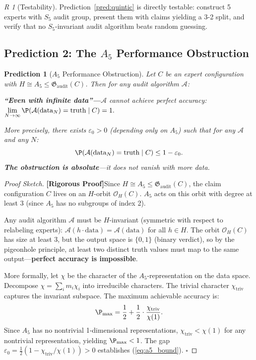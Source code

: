 \documentclass[12pt,a4paper]{article}
\newtheorem{prediction}[theorem]{Prediction}
\theoremstyle{remark}
\newtheorem{remark}[theorem]Remark
\newcommand{\AuditGrp}{\mathfrak{G}_{\mathrm{audit}}}
\newcommand{\rigorous}{\textnormal{\textbf{[Rigorous Proof]}}}
\begin{document}
\begin{remark}[Testability]
Prediction~\ref{pred:quintic} is directly testable: construct 5 experts with \(S_5\) audit group, present them with claims yielding a 3-2 split, and verify that no \(S_5\)-invariant audit algorithm beats random guessing.
\end{remark}
\subsection{Prediction 2: The \(A_5\) Performance Obstruction}
\begin{prediction}[\(A_5\) Performance Obstruction]\label{pred:a5_obstruction}
Let \(C\) be an expert configuration with \(H \cong A_5 \leq \AuditGrp(C)\). Then for any audit algorithm \(\mathcal{A}\):
\begin{center}
    \textbf{``Even with infinite data''---}\(\mathcal{A}\) cannot achieve perfect accuracy:\\
    \(\displaystyle\lim_{N \to \infty} \P(\mathcal{A}(\text{data}_N) = \text{truth} \mid C) = 1.\)
\end{center}
More precisely, there exists \(\varepsilon_0 > 0\) (depending only on \(A_5\)) such that for any \(\mathcal{A}\) and any \(N\):
\begin{equation}\label{eq:a5_bound}
    \P(\mathcal{A}(\text{data}_N) = \text{truth} \mid C) \leq 1 - \varepsilon_0.
\end{equation}
\textbf{The obstruction is absolute}---it does not vanish with more data.
\end{prediction}
\begin{proof}[Proof Sketch]
\rigorous Since \(H \cong A_5 \leq \AuditGrp(C)\), the claim configuration \(C\) lives on an \(H\)-orbit \(\mathcal{O}_H(C)\). \(A_5\) acts on this orbit with degree at least 3 (since \(A_5\) has no subgroups of index 2).

Any audit algorithm \(\mathcal{A}\) must be \(H\)-invariant (symmetric with respect to relabeling experts): \(\mathcal{A}(h \cdot \text{data}) = \mathcal{A}(\text{data})\) for all \(h \in H\). The orbit \(\mathcal{O}_H(C)\) has size at least 3, but the output space is \(\{0,1\}\) (binary verdict), so by the pigeonhole principle, at least two distinct truth values must map to the same output---\textbf{perfect accuracy is impossible}.

More formally, let \(\chi\) be the character of the \(A_5\)-representation on the data space. Decompose \(\chi = \sum_i m_i \chi_i\) into irreducible characters. The trivial character \(\chi_{\mathrm{triv}}\) captures the invariant subspace. The maximum achievable accuracy is:
\[
    \P_{\max} = \frac{1}{2} + \frac{1}{2} \cdot \frac{\chi_{\mathrm{triv}}}{\chi(1)}.
\]
Since \(A_5\) has no nontrivial 1-dimensional representations, \(\chi_{\mathrm{triv}} < \chi(1)\) for any nontrivial representation, yielding \(\P_{\max} < 1\). The gap \(\varepsilon_0 = \frac{1}{2}(1 - \chi_{\mathrm{triv}}/\chi(1)) > 0\) establishes (\ref{eq:a5_bound}). \(\square\)
\end{proof}
\end{document}
